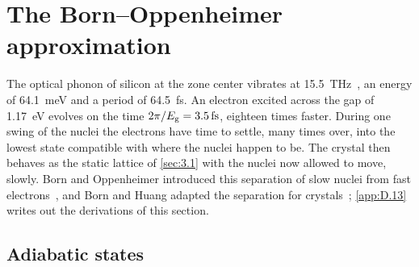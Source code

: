 \section{The Born--Oppenheimer approximation}\label{sec:5.1}

The optical phonon of silicon at the zone center vibrates at \SI{15.5}{THz}~\cite{nilsson1972study}, an energy of \SI{64.1}{meV} and a period of \SI{64.5}{fs}. An electron excited across the gap of \SI{1.17}{eV} evolves on the time $2\pi/E_{\mathrm{g}} = \SI{3.5}{fs}$, eighteen times faster. During one swing of the nuclei the electrons have time to settle, many times over, into the lowest state compatible with where the nuclei happen to be. The crystal then behaves as the static lattice of \cref{sec:3.1} with the nuclei now allowed to move, slowly. Born and Oppenheimer introduced this separation of slow nuclei from fast electrons~\cite{born1927quantentheorie}, and Born and Huang adapted the separation for crystals~\cite[App.~VIII]{born1954dynamical}; \cref{app:D.13} writes out the derivations of this section.

\subsection{Adiabatic states}

